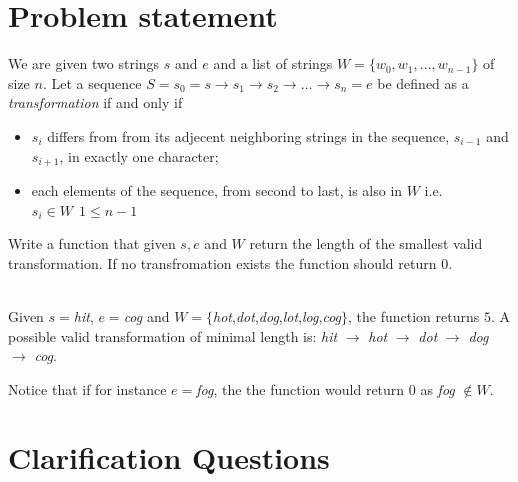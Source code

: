 \section{Problem statement}
\begin{exercise}
\label{example:word_ladder:exercice1}
We are given two strings $s$ and $e$ and a list of strings $W=\{w_0, w_1,\ldots,w_{n-1}\}$ of size $n$.
Let a sequence $S=s_0 = s \rightarrow s_1 \rightarrow s_2 \rightarrow \ldots \rightarrow s_n = e$ be defined as a \textit{transformation} if and only if 
\begin{itemize}
	\item $s_i$ differs from from its adjecent neighboring strings in the sequence, $s_{i-1}$ and $s_{i+1}$, in exactly one character;
	\item each elements of the sequence, from second to last, is also in $W$ i.e. $s_i \in W \: \: 1 \leq n-1 $
\end{itemize}
Write a function that given $s,e$ and $W$ return the length of the smallest valid transformation.
If no transfromation exists the function should return $0$.

	\begin{example}
		\label{example:word_ladder:example1}
		\hfill \\
		Given $s=$\textit{hit},  $e=$\textit{cog} and $W=\{$\textit{hot},\textit{dot},\textit{dog},\textit{lot},\textit{log},\textit{cog}$\}$, the function returns $5$.
		A possible valid transformation  of minimal length is: \textit{hit} $\rightarrow$ \textit{hot} $\rightarrow$ \textit{dot} $\rightarrow$ \textit{dog} $\rightarrow$ \textit{cog}.

		Notice that if for instance $e=$\textit{fog}, the the function would return $0$ as \textit{fog} $\notin W$.
	\end{example}

\end{exercise}

\section{Clarification Questions}

